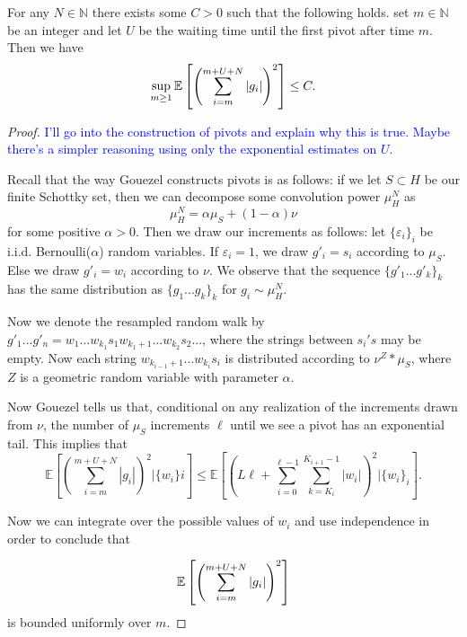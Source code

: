 \begin{lem}\label{lem: small values mn} For any $ N \in \mathbb{N} $ there exists some $ C > 0$ such that the following holds. set $ m \in \mathbb{N} $ be an integer and let $ U $ be the waiting time until the first pivot after time $ m $. Then we have
	$$\sup_{m\ge 1}\mathbb{E}\left[\left( \sum_{i=m}^{m+U+N}|g_i| \right)^2\right]\le C.$$
\end{lem}
\begin{proof}
	\textcolor{blue} { I'll go into the construction of pivots and explain why this is true. Maybe there's a simpler reasoning using only the exponential estimates on $ U $}.
	
	Recall that the way Gouezel constructs pivots is as follows: if we let $ S \subset H$ be our finite Schottky set, then we can decompose some convolution power $ \mu _{H} ^{N} $ as \[ \mu _{H} ^{N} = \alpha \mu _{S} + (1-\alpha)\nu \] for some positive $ \alpha >0$. Then we draw our increments as follows: let $ \{ \varepsilon _{i} \} _{i} $ be i.i.d. Bernoulli($ \alpha $) random variables. If $ \varepsilon _{i} = 1 $, we draw $ g' _{i} = s _{i} $ according to $ \mu _{S} $. Else we draw $g' _{i} = w _{i} $ according to $ \nu $. We observe that the sequence $ \{ g '_{1}...g' _{k} \} _{k} $ has the same distribution as $ \{ g _{1}...g _{k} \} _{k} $ for $ g _{i} \sim \mu _{H} ^{N} $.
	
	Now we denote the resampled random walk by $ g' _{1}...g' _{n} =w _{1}...w _{k _{1}} s _{1} w _{k _{1} +1} ...w _{k _{2}} s _{2} ... $, where the strings between $ s _{i}'s $ may be empty. Now each string $ w _{k _{i-1} +1}...w _{k _{i}} s _{i}  $ is distributed according to $ \nu ^{Z}* \mu _{S} $, where $ Z $ is a geometric random variable with parameter $ \alpha $. 
	
	Now Gouezel tells us that, conditional on any realization of the increments drawn from $ \nu $, the number of $ \mu _{S} $ increments $ \ell $ until we see a pivot has an exponential tail. This implies that
	\[ \mathbb{E} \left[\left(\sum_{i = m}^{m+U+N} |g _{i}| \right) ^{2} | \{ w _{i} \} i \right] \leq \mathbb{E} \left[\left(L\ell + \sum_{i = 0}^{\ell-1} \sum_{k = K _{i}}^{K _{i+1} -1} |w _{i}|\right) ^{2} | \{ w _{i} \} _{i} \right] .\] 
	
	Now we can integrate over the possible values of $ w _{i} $ and use independence in order to conclude that 
	
	\[ \mathbb{E}\left[\left( \sum_{i=m}^{m+U+N}|g_i| \right)^2\right] \] is bounded uniformly over $ m $.
\end{proof}

